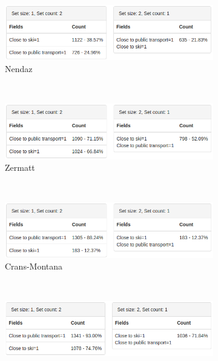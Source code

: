 \begin{figure}[H]
	\begin{subfigure}[t]{0.8\textwidth}
		\centering
		\includegraphics[width=1\textwidth]{images/hypothese5-nendaz}
		\caption{Nendaz}
		\label{sec:testingfazit:testing:hypothesen:5:1}
	\end{subfigure}  \\
	\begin{subfigure}[t]{0.8\textwidth}
		\centering
		\includegraphics[width=1\textwidth]{images/hypothese5-zermatt}
		\caption{Zermatt}
		\label{sec:testingfazit:testing:hypothesen:5:2}
	\end{subfigure} \\
	\begin{subfigure}[t]{0.8\textwidth}
		\centering
		\includegraphics[width=1\textwidth]{images/hypothese5-crans-montana}
		\caption{Crans-Montana}
		\label{sec:testingfazit:testing:hypothesen:5:3}
	\end{subfigure} \\
	\begin{subfigure}[t]{0.8\textwidth}
		\centering
		\includegraphics[width=1\textwidth]{images/hypothese5-grindelwald}

\end{subfigure}
\end{figure}
